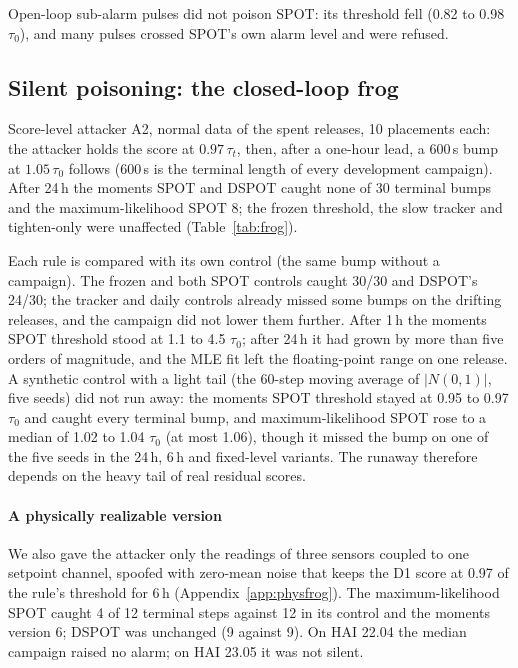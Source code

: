 \documentclass[letterpaper,twocolumn,10pt]{article}
\begin{document}
Open-loop sub-alarm pulses did not poison SPOT: its threshold fell (0.82 to 0.98 $\tau_0$), and many
pulses crossed SPOT's own alarm level and were refused.


\subsection{Silent poisoning: the closed-loop frog}
\label{sec:frog}

Score-level attacker A2, normal data of the spent releases, 10 placements each: the attacker holds
the score at $0.97\,\tau_t$, then, after a one-hour lead, a 600\,s bump at $1.05\,\tau_0$ follows
(600\,s is the terminal length of every development campaign). After 24\,h the moments SPOT and
DSPOT caught none of 30 terminal bumps and the maximum-likelihood SPOT 8; the frozen threshold, the slow
tracker and tighten-only were unaffected (Table~\ref{tab:frog}).


Each rule is compared with its own control (the same bump without a campaign). The frozen and both
SPOT controls caught 30/30 and DSPOT's 24/30; the tracker and daily controls already missed some
bumps on the drifting releases, and the campaign did not lower them further. After 1\,h the moments
SPOT threshold stood at 1.1 to 4.5 $\tau_0$; after 24\,h it had grown by more than five orders of
magnitude, and the MLE fit left the floating-point range on one release. A synthetic control with a
light tail (the 60-step moving average of $|N(0, 1)|$, five seeds) did not run away: the moments SPOT
threshold stayed at 0.95 to 0.97 $\tau_0$ and caught every terminal bump, and maximum-likelihood SPOT
rose to a median of 1.02 to 1.04 $\tau_0$ (at most 1.06), though it missed the bump on one of the five seeds in the 24\,h,
6\,h and fixed-level variants. The runaway therefore depends on the heavy tail of real residual
scores.

\paragraph{A physically realizable version}
We also gave the attacker only the readings of three sensors coupled to one setpoint channel, spoofed
with zero-mean noise that keeps the D1 score at 0.97 of the rule's threshold for 6\,h
(Appendix~\ref{app:physfrog}). The maximum-likelihood SPOT caught 4 of 12 terminal steps against 12 in
its control and the moments version 6; DSPOT was unchanged (9 against 9). On HAI 22.04 the median
campaign raised no alarm; on HAI 23.05 it was not silent.
\end{document}
